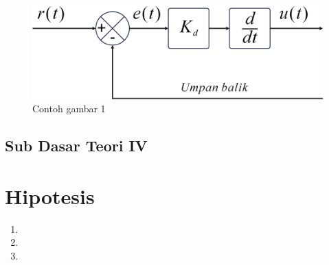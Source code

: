 \begin{figure}[H]
    \centering
    \includegraphics[width=0.8\linewidth]{gambar/diagram.png}
    \caption{Contoh gambar 1}
    \label{gambar1}
\end{figure}

\lipsum[2]

\subsection{Sub Dasar Teori IV}
\lipsum[2]

\section{Hipotesis}
\lipsum[2]

\begin{enumerate}
    \item \lipsum[2][4]
    \item \lipsum[2][4]
    \item \lipsum[2][4]
\end{enumerate}
